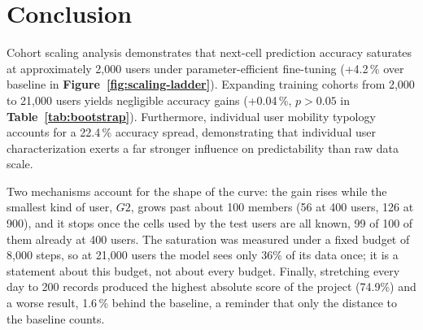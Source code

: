 

\section{Conclusion}
\label{sec:retro-scale}

Cohort scaling analysis demonstrates that next-cell prediction accuracy saturates at approximately 2,000 users under parameter-efficient fine-tuning (+4.2\,\% over baseline in \textbf{Figure~\ref{fig:scaling-ladder}}). Expanding training cohorts from 2,000 to 21,000 users yields negligible accuracy gains (+0.04\,\%, $p > 0.05$ in \textbf{Table~\ref{tab:bootstrap}}). Furthermore, individual user mobility typology accounts for a 22.4\,\% accuracy spread, demonstrating that individual user characterization exerts a far stronger influence on predictability than raw data scale.

Two mechanisms account for the shape of the curve: the gain rises while the smallest kind of user, $G2$, grows past about 100 members (56 at 400 users, 126 at 900), and it stops once the cells used by the test users are all known, 99 of 100 of them already at 400 users. The saturation was measured under a fixed budget of 8,000 steps, so at 21,000 users the model sees only 36\% of its data once; it is a statement about this budget, not about every budget. Finally, stretching every day to 200 records produced the highest absolute score of the project (74.9\%) and a worse result, 1.6\,\% behind the baseline, a reminder that only the distance to the baseline counts.
